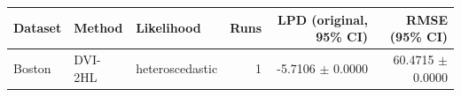 \begin{tabular}{lllrrr}
\toprule
Dataset & Method & Likelihood & Runs & LPD (original, 95\% CI) & RMSE (95\% CI) \\
\midrule
Boston & DVI-2HL & heteroscedastic & 1 & -5.7106 $\pm$ 0.0000 & 60.4715 $\pm$ 0.0000 \\
\bottomrule
\end{tabular}
